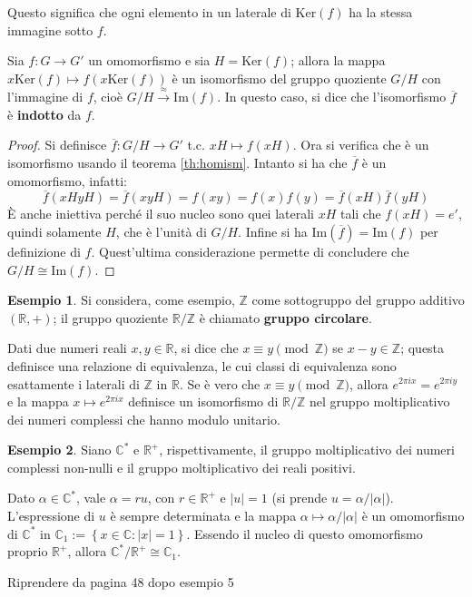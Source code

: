 \documentclass[11pt, a4paper]{scrartcl}
\theoremstyle{definition}
\newtheorem{esempio}{Esempio}
\numberwithin{esempio}{section}
\theoremstyle{definition}
\numberwithin{obs}{section}
\numberwithin{nota}{section}
\numberwithin{equation}{subsection}
\begin{document}
Questo significa che ogni elemento in un laterale di $\mathrm{Ker} (f)$ ha la stessa immagine sotto $f$.
\begin{corollario}
	{}{}
	Sia $f:G\to G'$ un omomorfismo e sia $H= \mathrm{Ker} (f)$; allora la mappa $x \mathrm{Ker} (f) \mapsto f(x \mathrm{Ker} (f))$ \`e un isomorfismo del gruppo quoziente $G / H$ con l'immagine di $f$, cio\`e $G/H \stackrel{\approx}{\longrightarrow}\mathrm{Im} (f)$.
In questo caso, si dice che l'isomorfismo $\overline{f}$ \`e \textbf{indotto} da $f$.
	\begin{proof}
		Si definisce $\overline{f}: G / H \to G' $ t.c. $ xH \mapsto f(xH)$. Ora si verifica che \`e un isomorfismo usando il teorema \ref{th:homism}. Intanto si ha che $\overline{f}$ \`e un omomorfismo, infatti:
		\[
		\overline{f}(xHyH) = \overline{f}(xyH) = f(xy) = f(x)f(y) = \overline{f}(xH) \overline{f}(yH)
		\] 
\`E anche iniettiva perch\'e il suo nucleo sono quei laterali $xH$ tali che $f(xH) = e'$, quindi solamente $H$, che \`e l'unit\`a di $G / H$.
Infine si ha $\mathrm{Im} (\overline{f}) = \mathrm{Im} (f)$ per definizione di $f$.
Quest'ultima considerazione permette di concludere che $G / H \cong \mathrm{Im} (f)$.
	\end{proof}
\end{corollario}
\begin{esempio}
Si considera, come esempio, $\mathbb{Z}$ come sottogruppo del gruppo additivo $(\mathbb{R}, + )$; il gruppo quoziente $\mathbb{R} / \mathbb{Z}$ \`e chiamato \textbf{gruppo circolare}. 

Dati due numeri reali $x,y \in \mathbb{R}$, si dice che $x \equiv y \pmod{\mathbb{Z}}$ se $x - y \in \mathbb{Z}$; questa definisce una relazione di equivalenza, le cui classi di equivalenza sono esattamente i laterali di $\mathbb{Z}$ in $\mathbb{R}$. 
Se \`e vero che $x \equiv y \pmod{\mathbb{Z}}$, allora $e^{2\pi i x} = e^{2\pi i y} $ e la mappa $x \mapsto e^{2\pi i x} $ definisce un isomorfismo di $\mathbb{R} / \mathbb{Z}$ nel gruppo moltiplicativo dei numeri complessi che hanno modulo unitario.
\end{esempio}
\begin{esempio}
Siano $\mathbb{C}^*$ e $\mathbb{R}^+$, rispettivamente, il gruppo moltiplicativo dei numeri complessi non-nulli e il gruppo moltiplicativo dei reali positivi.

Dato $\alpha \in \mathbb{C}^*$, vale $\alpha  = ru$, con $r \in \mathbb{R}^+$ e $\lvert u \rvert = 1$ (si prende $u = \alpha  / \lvert \alpha  \rvert $). 
L'espressione di $u$ \`e sempre determinata e la mappa $\alpha \mapsto \alpha / \lvert \alpha  \rvert $ \`e un omomorfismo di $\mathbb{C}^*$ in $\mathbb{C}_1 := \left\{ x \in \mathbb{C} : \lvert x \rvert = 1 \right\} $.
Essendo il nucleo di questo omomorfismo proprio $\mathbb{R}^+$, allora $\mathbb{C}^* / \mathbb{R}^+ \cong \mathbb{C}_1$.
\end{esempio}
\begin{center}
	\color{asdf}Riprendere da pagina 48 dopo esempio 5
\end{center}
\end{document}
